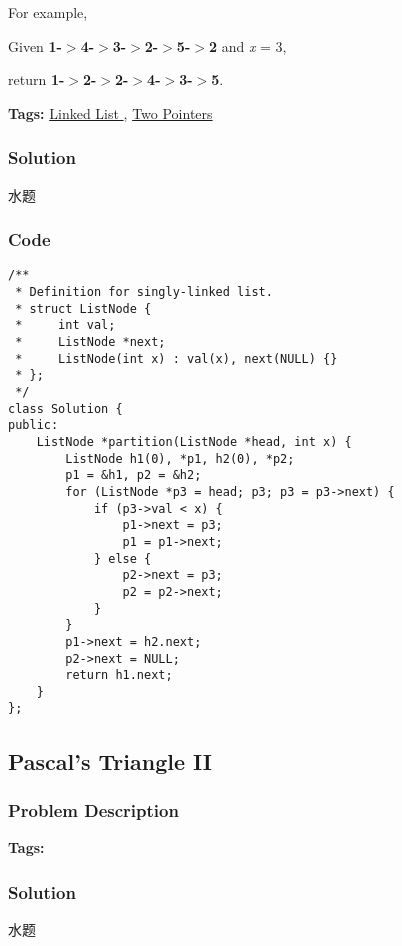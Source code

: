 \documentclass{article}
\begin{document}
\begin{CJK*}{UTF8}{gkai}
For example,


Given \textbf{1-$>$4-$>$3-$>$2-$>$5-$>$2} and \emph{x} = 3,


return \textbf{1-$>$2-$>$2-$>$4-$>$3-$>$5}.


\textbf{Tags: }
\hyperref[ Linked List ]{ Linked List },  \hyperref[ Two Pointers ]{ Two Pointers }



\subsubsection*{Solution}
水题

\subsubsection*{Code}
\begin{lstlisting}
/**
 * Definition for singly-linked list.
 * struct ListNode {
 *     int val;
 *     ListNode *next;
 *     ListNode(int x) : val(x), next(NULL) {}
 * };
 */
class Solution {
public:
    ListNode *partition(ListNode *head, int x) {
        ListNode h1(0), *p1, h2(0), *p2;
        p1 = &h1, p2 = &h2;
        for (ListNode *p3 = head; p3; p3 = p3->next) {
            if (p3->val < x) {
                p1->next = p3;
                p1 = p1->next;
            } else {
                p2->next = p3;
                p2 = p2->next;
            }
        }
        p1->next = h2.next;
        p2->next = NULL;
        return h1.next;
    }
}; 
\end{lstlisting}


\subsection{ Pascal's Triangle II }
\label{ Pascal's Triangle II }

\subsubsection*{Problem Description}

\textbf{Tags: }



\subsubsection*{Solution}
水题


\end{CJK*}
\end{document}

